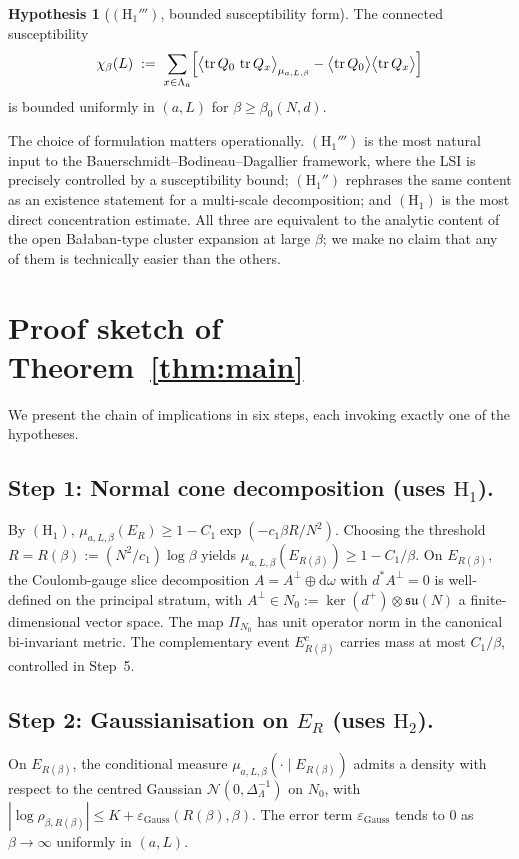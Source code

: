 \documentclass[11pt,reqno]{amsart}
\theoremstyle{plain}
\theoremstyle{definition}
\newtheorem{hypothesis}[theorem]{Hypothesis}
\theoremstyle{remark}
\newcommand{\tr}{\operatorname{tr}}
\newcommand{\dd}{\mathrm{d}}
\newcommand{\Lat}{\Lambda}
\newcommand{\sun}{\mathfrak{su}(N)}
\begin{document}
\begin{hypothesis}[$(\mathrm{H}_1''')$, bounded susceptibility form]
\label{hyp:H1ppp}
The connected susceptibility
\[
  \chi_\beta(L) \;:=\; \sum_{x \in \Lat_a} \Bigl[ \bigl\langle \tr Q_0 \, \tr Q_x \bigr\rangle_{\mu_{a, L, \beta}} - \bigl\langle \tr Q_0 \bigr\rangle \bigl\langle \tr Q_x \bigr\rangle \Bigr]
\]
is bounded uniformly in $(a, L)$ for $\beta \ge \beta_0(N, d)$.
\end{hypothesis}

The choice of formulation matters operationally. $(\mathrm{H}_1''')$ is the most natural input to the Bauerschmidt--Bodineau--Dagallier framework, where the LSI is precisely controlled by a susceptibility bound; $(\mathrm{H}_1'')$ rephrases the same content as an existence statement for a multi-scale decomposition; and $(\mathrm{H}_1)$ is the most direct concentration estimate. All three are equivalent to the analytic content of the open Bałaban-type cluster expansion at large $\beta$; we make no claim that any of them is technically easier than the others.

\section{Proof sketch of Theorem~\ref{thm:main}}
\label{sec:proof-sketch}

We present the chain of implications in six steps, each invoking exactly one of the hypotheses.

\subsection{Step 1: Normal cone decomposition (uses $\mathrm{H}_1$).}
By $(\mathrm{H}_1)$, $\mu_{a, L, \beta}(E_R) \ge 1 - C_1 \exp(-c_1 \beta R / N^2)$. Choosing the threshold $R = R(\beta) := (N^2/c_1) \log \beta$ yields $\mu_{a, L, \beta}(E_{R(\beta)}) \ge 1 - C_1/\beta$. On $E_{R(\beta)}$, the Coulomb-gauge slice decomposition $A = A^\perp \oplus \dd \omega$ with $d^* A^\perp = 0$ is well-defined on the principal stratum, with $A^\perp \in N_0 := \ker(d^+) \otimes \sun$ a finite-dimensional vector space. The map $\Pi_{N_0}$ has unit operator norm in the canonical bi-invariant metric. The complementary event $E_{R(\beta)}^c$ carries mass at most $C_1/\beta$, controlled in Step~5.

\subsection{Step 2: Gaussianisation on $E_R$ (uses $\mathrm{H}_2$).}
On $E_{R(\beta)}$, the conditional measure $\mu_{a, L, \beta}(\cdot \mid E_{R(\beta)})$ admits a density with respect to the centred Gaussian $\mathcal{N}(0, \Delta_\Lat^{-1})$ on $N_0$, with $|\log \rho_{\beta, R(\beta)}| \le K + \varepsilon_{\mathrm{Gauss}}(R(\beta), \beta)$. The error term $\varepsilon_{\mathrm{Gauss}}$ tends to $0$ as $\beta \to \infty$ uniformly in $(a, L)$.
\end{document}
